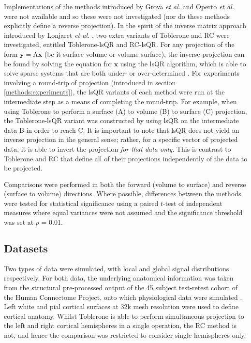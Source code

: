 \documentclass[review]{elsarticle}
\newcommand{\mat}[1]{\mathrm{#1}}
\renewcommand{\vec}[1]{\mathbf{#1}}
\begin{document}
Implementations of the methods introduced by Grova \textit{et al.} and Operto \textit{et al.} \cite{Grova2006, Operto2008} were not available and so these were not investigated (nor do these methods explicitly define a reverse projection). In the spirit of the inverse matrix approach introduced by Lonjaret \textit{et al.} \cite{Lonjaret2017}, two extra variants of Toblerone and RC were investigated, entitled Toblerone-lsQR and RC-lsQR. For any projection of the form $\vec{y} = \mat{A}\vec{x}$ (be it surface-volume or volume-surface), the inverse projection can be found by solving the equation for $\vec{x}$ using the lsQR algorithm, which is able to solve sparse systems that are both under- or over-determined \cite{10.1145/355984.355989}. For experiments involving a round-trip of projection (introduced in section \ref{methods:experiments}), the lsQR variants of each method were run at the intermediate step as a means of completing the round-trip. For example, when using Toblerone to perform a surface (A) to volume (B) to surface (C) projection, the Toblerone-lsQR variant was constructed by using lsQR on the intermediate data B in order to reach C. It is important to note that lsQR does not yield an inverse projection in the general sense; rather, for a specific vector of projected data, it is able to invert the projection \textit{for that data only}. This is contrast to Toblerone and RC that define all of their projections independently of the data to be projected. 

Comparisons were performed in both the forward (volume to surface) and reverse (surface to volume) directions. Where possible, differences between the methods were tested for statistical significance using a paired $t$-test of independent measures where equal variances were not assumed and the significance threshold was set at $p$ = 0.01.  

\subsection{Datasets}
Two types of data were simulated, with local and global signal distributions respectively. For both data, the underlying anatomical information was taken from the structural pre-processed output of the 45 subject test-retest cohort of the Human Connectome Project, onto which physiological data were simulated \cite{Glasser2013}. Left white and pial cortical surfaces at 32k mesh resolution were used to define cortical anatomy. Whilst Toblerone is able to perform simultaneous projection to the left and right cortical hemispheres in a single operation, the RC method is not, and hence the comparison was restricted to consider single hemispheres only. 
\end{document}
